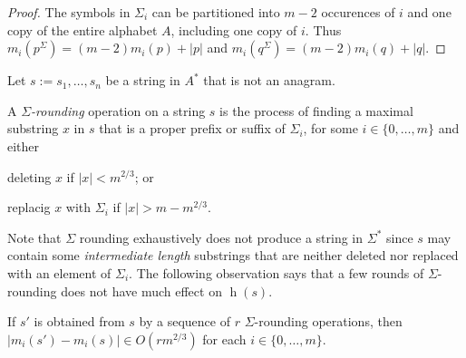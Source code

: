 \documentclass[kpfonts]{patmorin}
\DeclareMathOperator{\hist}{h}
\begin{document}
\begin{proof}
    The symbols in $\Sigma_i$ can be partitioned into $m-2$ occurences of $i$ and one copy of the entire alphabet $A$, including one copy of $i$.  Thus $m_i(p^\Sigma)=(m-2)m_i(p)+|p|$ and $m_i(q^\Sigma)=(m-2)m_i(q)+|q|$.
\end{proof}


\begin{lem}
    Let $s:=s_1,\ldots,s_n$ be a string in $A^*$ that is not an anagram.
\end{lem}


A \emph{$\Sigma$-rounding} operation on a string $s$ is the process of finding a maximal substring $x$ in $s$ that is a proper prefix or suffix of $\Sigma_i$, for some $i\in\{0,\ldots,m\}$ and either
\begin{inparaenum}[(i)]
    \item deleting $x$ if $|x|<m^{2/3}$; or
    \item replacig $x$ with $\Sigma_i$ if $|x|>m-m^{2/3}$.
\end{inparaenum}
Note that $\Sigma$ rounding exhaustively does not produce a string in $\Sigma^*$ since $s$ may contain some \emph{intermediate length} substrings that are neither deleted nor replaced with an element of $\Sigma_i$. The following observation says that a few rounds of $\Sigma$-rounding does not have much effect on $\hist(s)$.
\begin{obs}
    If $s'$ is obtained from $s$ by a sequence of $r$ $\Sigma$-rounding operations, then $|m_i(s')-m_i(s)|\in O(r m^{2/3})$ for each $i\in\{0,\ldots,m\}$.
\end{obs}
\end{document}
